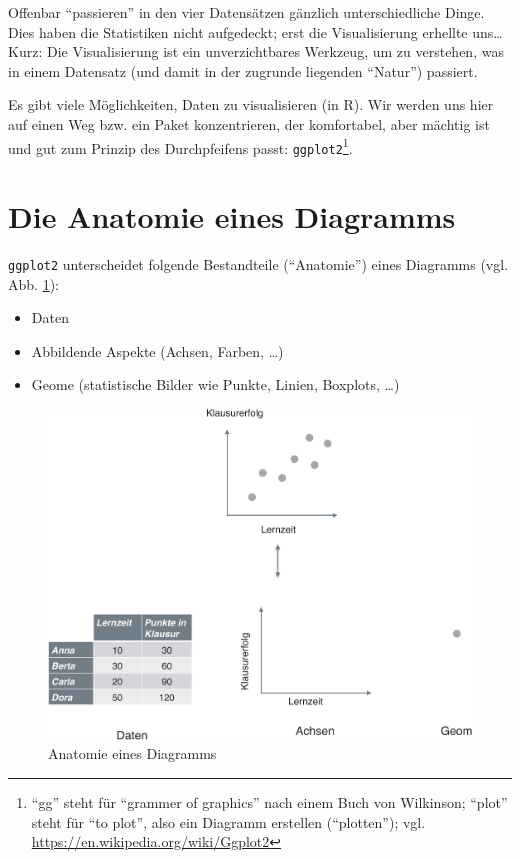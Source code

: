\documentclass[12pt,ngerman,]{book}
\providecommand{\tightlist}{%
  \setlength{\itemsep}{0pt}\setlength{\parskip}{0pt}}
\let\rmarkdownfootnote\footnote%
\def\footnote{\protect\rmarkdownfootnote}
\begin{document}
Offenbar ``passieren'' in den vier Datensätzen gänzlich unterschiedliche
Dinge. Dies haben die Statistiken nicht aufgedeckt; erst die
Visualisierung erhellte uns\ldots{} Kurz: Die Visualisierung ist ein
unverzichtbares Werkzeug, um zu verstehen, was in einem Datensatz (und
damit in der zugrunde liegenden ``Natur'') passiert.

Es gibt viele Möglichkeiten, Daten zu visualisieren (in R). Wir werden
uns hier auf einen Weg bzw. ein Paket konzentrieren, der komfortabel,
aber mächtig ist und gut zum Prinzip des Durchpfeifens passt:
\texttt{ggplot2}\footnote{``gg'' steht für ``grammer of graphics'' nach
  einem Buch von Wilkinson\citeyearpar{wilkinson2006grammar}; ``plot''
  steht für ``to plot'', also ein Diagramm erstellen (``plotten''); vgl.
  \url{https://en.wikipedia.org/wiki/Ggplot2}}.

\section{Die Anatomie eines
Diagramms}\label{die-anatomie-eines-diagramms}

\texttt{ggplot2} unterscheidet folgende Bestandteile (``Anatomie'')
eines Diagramms (vgl. Abb. \ref{fig:fig-anatomie}):

\begin{itemize}
\tightlist
\item
  Daten
\item
  Abbildende Aspekte (Achsen, Farben, \ldots{})
\item
  Geome (statistische Bilder wie Punkte, Linien, Boxplots, \ldots{})
\end{itemize}

\begin{figure}

{\centering \includegraphics[width=0.7\linewidth]{images/anatomie_diagramm_crop} 

}

\caption{Anatomie eines Diagramms}\label{fig:fig-anatomie}
\end{figure}
\end{document}
